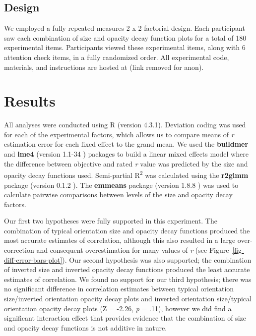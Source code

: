 \documentclass[manuscript, review, anonymous, screen]{acmart}
\begin{document}
\hypertarget{sec-design}{%
\subsection{Design}\label{sec-design}}

We employed a fully repeated-measures 2 x 2 factorial design. Each
participant saw each combination of size and opacity decay function
plots for a total of 180 experimental items. Participants viewed these
experimental items, along with 6 attention check items, in a fully
randomized order. All experimental code, materials, and instructions are
hosted at (link removed for anon).

\hypertarget{sec-results}{%
\section{Results}\label{sec-results}}

All analyses were conducted using R (version 4.3.1). Deviation coding
was used for each of the experimental factors, which allows us to
compare means of \emph{r} estimation error for each fixed effect to the
grand mean. We used the \textbf{buildmer} and \textbf{lme4} (version
1.1-34 \citep{lme4}) packages to build a linear mixed effects model
where the difference between objective and rated \emph{r} value was
predicted by the size and opacity decay functions used. Semi-partial
R\textsuperscript{2} was calculated using the \textbf{r2glmm} package
(version 0.1.2 \citep{r2glmm}). The \textbf{emmeans} package (version
1.8.8 \citep{emmeans}) was used to calculate pairwise comparisons
between levels of the size and opacity decay factors.

Our first two hypotheses were fully supported in this experiment. The
combination of typical orientation size and opacity decay functions
produced the most accurate estimates of correlation, although this also
resulted in a large over-correction and consequent overestimation for
many values of \emph{r} (see Figure~\ref{fig-diff-error-bars-plot}). Our
second hypothesis was also supported; the combination of inverted size
and inverted opacity decay functions produced the least accurate
estimates of correlation. We found no support for our third hypothesis;
there was no significant difference in correlation estimates between
typical orientation size/inverted orientation opacity decay plots and
inverted orientation size/typical orientation opacity decay plots (Z =
-2.26, \emph{p} = .11), however we did find a significant interaction
effect that provides evidence that the combination of size and opacity
decay functions is not additive in nature.
\end{document}
